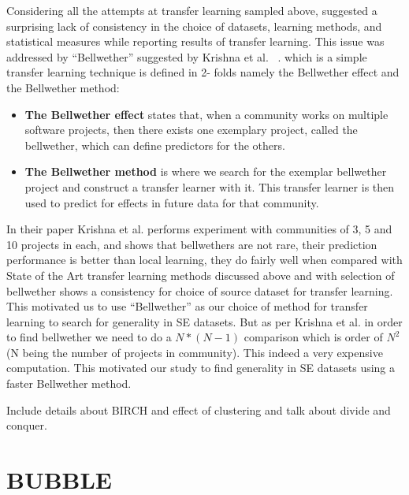 \documentclass[10pt,journal,compsoc]{IEEEtran}
\newcommand{\bi}{\begin{itemize}}
\newcommand{\ei}{\end{itemize}}
\begin{document}
Considering all the attempts at transfer learning sampled above, suggested a surprising lack of consistency in the choice of datasets, learning methods, and statistical measures while reporting results of transfer learning. This issue was addressed by ``Bellwether'' suggested by Krishna et al. ~\cite{krishna2017simpler,krishna16}. which is a simple transfer learning technique is defined in 2- folds namely the Bellwether effect and the Bellwether method:

\bi

    \item \textbf{The Bellwether effect} states that, when a community works on multiple software projects,  then there exists one exemplary project, called the bellwether, which can define predictors for the others.
    
    \item \textbf{The Bellwether method} is where we search for the exemplar bellwether project and construct a transfer learner with it. This transfer learner is then used to predict for effects in future data for that community.

\ei

In their paper Krishna et al. performs experiment with communities of 3, 5 and 10 projects in each, and shows that bellwethers are not rare, their prediction performance is better than local learning, they do fairly well when compared with State of the Art transfer learning methods discussed above and with selection of bellwether shows a consistency for choice of source dataset for transfer learning. This motivated us to use ``Bellwether'' as our choice of method for transfer learning to search for generality in SE datasets. But as per Krishna et al. in order to find bellwether we need to do a $ N*(N-1) $ comparison which is order of $ N^2 $ (N being the number of projects in community). This indeed a very expensive computation. This motivated our study to find generality in SE datasets using a faster Bellwether method. 

Include details about BIRCH and effect of clustering and talk about divide and conquer. 


\section{BUBBLE}
\label{BUBBLE}
\end{document}
